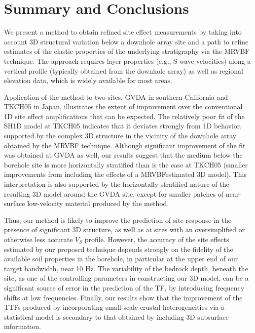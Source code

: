 \section{Summary and Conclusions}\label{etf:conclusions}
We present a method to obtain refined site effect measurements by taking into account 3D structural variation below a downhole array site and a path to refine estimates of the elastic properties of the underlying stratigraphy via the MRVBF technique. The approach requires layer properties (e.g., S-wave velocities) along a vertical profile (typically obtained from the downhole array) as well as regional elevation data, which is widely available for most areas.

Application of the method to two sites, GVDA in southern California and TKCH05 in Japan, illustrates the extent of improvement over the conventional 1D site effect amplifications that can be expected. The relatively poor fit of the SH1D model at TKCH05 indicates that it deviates strongly from 1D behavior, supported by the complex 3D structure in the vicinity of the downhole array obtained by the MRVBF technique. Although significant improvement of the fit was obtained at GVDA as well, our results suggest that the medium below the borehole site is more horizontally stratified than is the case at TKCH05 (smaller improvements from including the effects of a MRVBFestimated 3D model). This interpretation is also supported by the horizontally stratified nature of the resulting 3D model around the GVDA site, except for smaller patches of near-surface low-velocity material produced by the method.

Thus, our method is likely to improve the prediction of site response in the presence of significant 3D structure, as well as at sites with an oversimplified or otherwise less accurate $V_S$ profile. However, the accuracy of the site effects estimated by our proposed technique depends strongly on the fidelity of the available soil properties in the borehole, in particular at the upper end of our target bandwidth, near 10 Hz. The variability of the bedrock depth, beneath the site, as one of the controlling parameters in constructing our 3D model, can be a significant source of error in the prediction of the TF, by introducing frequency shifts at low frequencies. Finally, our results show that the improvement of the TTFs produced by incorporating small-scale crustal heterogeneities via a statistical model is secondary to that obtained by including 3D subsurface information.

